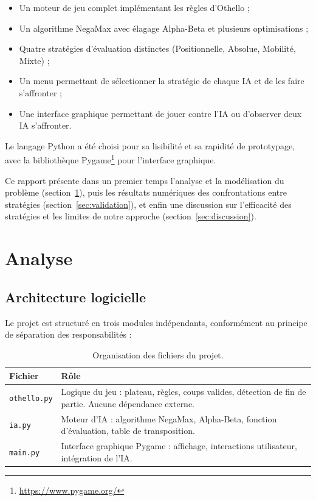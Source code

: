 \documentclass[12pt, a4paper]{article}
\begin{document}
\begin{itemize}
    \item Un moteur de jeu complet implémentant les règles d'Othello ;
    \item Un algorithme NegaMax avec élagage Alpha-Beta et plusieurs optimisations ;
    \item Quatre stratégies d'évaluation distinctes (Positionnelle, Absolue, Mobilité, Mixte) ;
    \item Un menu permettant de sélectionner la stratégie de chaque IA et de les faire s'affronter ;
    \item Une interface graphique permettant de jouer contre l'IA ou d'observer deux IA s'affronter.
\end{itemize}

Le langage Python a été choisi pour sa lisibilité et sa rapidité de prototypage, avec la bibliothèque Pygame\footnote{\url{https://www.pygame.org/}} pour l'interface graphique.

Ce rapport présente dans un premier temps l'analyse et la modélisation du problème (section~\ref{sec:analyse}), puis les résultats numériques des confrontations entre stratégies (section~\ref{sec:validation}), et enfin une discussion sur l'efficacité des stratégies et les limites de notre approche (section~\ref{sec:discussion}).


\section{Analyse}
\label{sec:analyse}

\subsection{Architecture logicielle}

Le projet est structuré en trois modules indépendants, conformément au principe de séparation des responsabilités :

\begin{table}[H]
\centering
\caption{Organisation des fichiers du projet.}
\label{tab:fichiers}
\begin{tabular}{@{} l p{10cm} @{}}
\toprule
\textbf{Fichier} & \textbf{Rôle} \\
\midrule
\texttt{othello.py} & Logique du jeu : plateau, règles, coups valides, détection de fin de partie. Aucune dépendance externe. \\
\texttt{ia.py} & Moteur d'IA : algorithme NegaMax, Alpha-Beta, fonction d'évaluation, table de transposition. \\
\texttt{main.py} & Interface graphique Pygame : affichage, interactions utilisateur, intégration de l'IA. \\
\bottomrule
\end{tabular}
\end{table}
\end{document}
